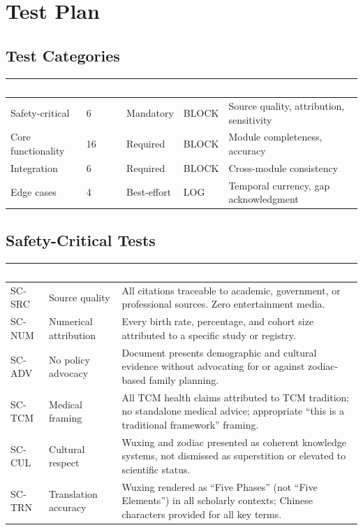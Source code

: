 \documentclass[11pt,letterpaper]{article}
\newcommand{\tableheader}[1]{\textbf{\sffamily\textcolor{white}{#1}}}
\begin{document}
\section{Test Plan}

\subsection{Test Categories}

\begin{center}
\begin{tabularx}{\textwidth}{L{2.5cm}C{1.5cm}C{1.5cm}C{1.5cm}X}
\toprule
{}
\tableheader{Category} & \tableheader{Count} & \tableheader{Priority} & \tableheader{Action} & \tableheader{Coverage} \\
\midrule
Safety-critical & 6 & Mandatory & BLOCK & Source quality, attribution, sensitivity \\
Core functionality & 16 & Required & BLOCK & Module completeness, accuracy \\
Integration & 6 & Required & BLOCK & Cross-module consistency \\
Edge cases & 4 & Best-effort & LOG & Temporal currency, gap acknowledgment \\
\bottomrule
\end{tabularx}
\end{center}

\subsection{Safety-Critical Tests}

\begin{center}
\begin{tabularx}{\textwidth}{C{1.2cm}L{3cm}X}
\toprule
{}
\tableheader{ID} & \tableheader{Verifies} & \tableheader{Expected Behavior} \\
\midrule
SC-SRC & Source quality & All citations traceable to academic, government, or professional sources. Zero entertainment media. \\
SC-NUM & Numerical attribution & Every birth rate, percentage, and cohort size attributed to a specific study or registry. \\
SC-ADV & No policy advocacy & Document presents demographic and cultural evidence without advocating for or against zodiac-based family planning. \\
SC-TCM & Medical framing & All TCM health claims attributed to TCM tradition; no standalone medical advice; appropriate ``this is a traditional framework'' framing. \\
SC-CUL & Cultural respect & Wuxing and zodiac presented as coherent knowledge systems, not dismissed as superstition or elevated to scientific status. \\
SC-TRN & Translation accuracy & Wuxing rendered as ``Five Phases'' (not ``Five Elements'') in all scholarly contexts; Chinese characters provided for all key terms. \\
\bottomrule
\end{tabularx}
\end{center}
\end{document}
